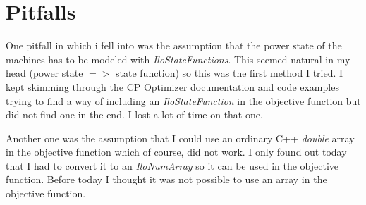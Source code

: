 \section{Pitfalls}

One pitfall in which i fell into was the assumption that the power state of the machines has to be modeled with \textit{IloStateFunctions}. This seemed natural in my head (power state $=>$ state function) so this was the first method I tried. I kept skimming through the CP Optimizer documentation and code examples trying to find a way of including an \textit{IloStateFunction} in the objective function but did not find one in the end. I lost a lot of time on that one. \newline

Another one was the assumption that I could use an ordinary C++ \textit{double} array in the objective function which of course, did not work. I only found out today that I had to convert it to an \textit{IloNumArray} so it can be used in the objective function. Before today I thought it was not possible to use an array in the objective function.